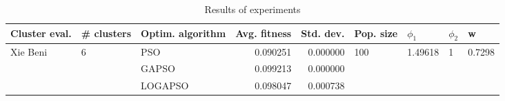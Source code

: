 \begin{table}
\centering
\caption{Results of experiments}
\begin{tabular}{lllrrllll}
\toprule
            Cluster eval. &        \# clusters & Optim. algorithm &  Avg. fitness &  Std. dev. &            Pop. size &               $\phi_{1}$ &         $\phi_{2}$ &                       w \\
\midrule
\multirow{3}{*}{Xie Beni} & \multirow{3}{*}{6} &              PSO &      0.090251 &   0.000000 & \multirow{3}{*}{100} & \multirow{3}{*}{1.49618} & \multirow{3}{*}{1} & \multirow{3}{*}{0.7298} \\
                          &                    &            GAPSO &      0.099213 &   0.000000 &                      &                          &                    &                         \\
                          &                    &          LOGAPSO &      0.098047 &   0.000738 &                      &                          &                    &                         \\
\bottomrule
\end{tabular}
\end{table}
